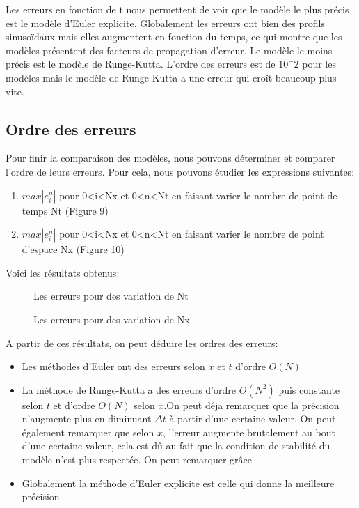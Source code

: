 Les erreurs en fonction de t nous permettent de voir que le modèle le plus précis est le modèle d'Euler explicite.
Globalement les erreurs ont bien des profils sinusoïdaux mais elles augmentent en fonction du temps, ce qui montre que les modèles présentent des facteurs de propagation d'erreur.
Le modèle le moins précis est le modèle de Runge-Kutta.
L'ordre des erreurs est de $10^-2$ pour les modèles mais le modèle de Runge-Kutta a une erreur qui croît beaucoup plus vite.

\vspace{1cm}
\subsection{Ordre des erreurs}
Pour finir la comparaison des modèles, nous pouvons déterminer et comparer l'ordre de leurs erreurs.
Pour cela, nous pouvons étudier les expressions suivantes:
\begin{enumerate}
    \item $max|e^n_{i}|$ pour 0<i<Nx et 0<n<Nt en faisant varier le nombre de point de temps Nt (Figure 9)
    \item $max|e^n_{i}|$ pour 0<i<Nx et 0<n<Nt en faisant varier le nombre de point d'espace Nx (Figure 10)
\end{enumerate}

Voici les résultats obtenus:

\begin{figure}[H]
\begin{center}
\centering{}
\caption{Les erreurs pour des variation de Nt\label{fig1}}
\end{center}
\end{figure}

\begin{figure}[H]
\begin{center}
\centering{}
\caption{Les erreurs pour des variation de Nx\label{fig1}}
\end{center}
\end{figure}

A partir de ces résultats, on peut déduire les ordres des erreurs:
\begin{itemize}
    \item Les méthodes d'Euler ont des erreurs selon $x$ et $t$ d'ordre $O(N)$
    \item La méthode de Runge-Kutta a des erreurs  d'ordre $O(N^2)$ puis constante selon $t$ et d'ordre $O(N)$ selon $x$.On peut déja remarquer que la précision n'augmente plus en diminuant $\Delta t$ à partir d'une certaine valeur. On peut également remarquer que selon $x$, l'erreur augmente brutalement au bout d'une certaine valeur, cela est dû au fait que la condition de stabilité du modèle n'est plus respectée. On peut remarquer grâce
    \item Globalement la méthode d'Euler explicite est celle qui donne la meilleure précision.
\end{itemize}

